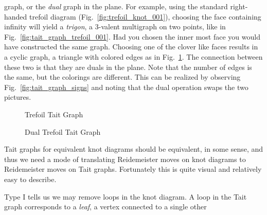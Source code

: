         graph, or the \textit{dual} graph in the plane. For example, using the
        standard right-handed trefoil diagram
        (Fig.~\ref{fig:trefoil_knot_001}), choosing the face containing
        infinity will yield a \textit{trigon}, a 3-valent multigraph on two
        points, like in Fig.~\ref{fig:tait_graph_trefoil_001}. Had you chosen
        the inner most face you would have constructed the same graph. Choosing
        one of the clover like faces results in a cyclic graph, a triangle with
        colored edges as in Fig.~\ref{fig:tait_graph_trefoil_002}. The
        connection between these two is that they are duals in the plane.
        Note that the number of edges is the same, but the colorings are
        different. This can be realized by observing
        Fig.~\ref{fig:tait_graph_signs} and noting that the dual operation
        swaps the two pictures.
        \begin{figure}
            \centering
            \begin{minipage}[b]{0.49\textwidth}
                \centering
                \vspace{2em}
                \caption{Trefoil Tait Graph}
                \label{fig:tait_graph_trefoil_001}
            \end{minipage}
            \hfill
            \begin{minipage}[b]{0.49\textwidth}
                \centering
                \caption{Dual Trefoil Tait Graph}
                \label{fig:tait_graph_trefoil_002}
            \end{minipage}
        \end{figure}
        \par\hfill\par
        Tait graphs for equivalent knot diagrams should be equivalent,
        in some sense, and thus
        we need a mode of translating Reidemeister moves on knot diagrams to
        Reidemeister moves on Tait graphs. Fortunately this is quite visual and
        relatively easy to describe.
        \par\hfill\par
        Type I tells us we may remove loops in the knot diagram.
        A loop in the Tait graph
        corresponds to a \textit{leaf}, a vertex connected to a single other
